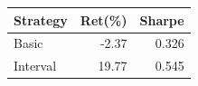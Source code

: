 {\tiny\setlength{\tabcolsep}{2pt}\begin{tabular}{lrr} \toprule
Strategy & Ret(\%) & Sharpe \\ \midrule
Basic & -2.37 & 0.326 \\ 
Interval & 19.77 & 0.545 \\ 
\bottomrule \end{tabular}}